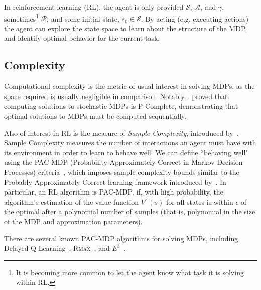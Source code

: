 \documentclass[11pt]{article}
\newcommand\davenote[1]{\textcolor{blue}{Dave: #1}}
\begin{document}

In reinforcement learning (RL), the agent is only provided $\mathcal{S}$, $\mathcal{A}$, and $\gamma$, sometimes\footnote{It is becoming more common to let the agent know what task it is solving within RL.} $\mathcal{R}$, and some initial state, $s_0 \in \mathcal{S}$. By acting (e.g. executing actions) the agent can explore the state space to learn about the structure of the MDP, and identify optimal behavior for the current task.


\subsection{Complexity}

Computational complexity is the metric of usual interest in solving MDPs, as the space required is usually negligible in comparison. Notably,~\cite{papadimitriou1987complexity} proved that computing solutions to stochastic MDPs is P-Complete, demonstrating that optimal solutions to MDPs must be computed sequentially.

Also of interest in RL is the measure of {\it Sample Complexity}, introduced by~\cite{kakade2003sample}. Sample Complexity measures the number of interactions an agent must have with its environment in order to learn to behave well. We can define ``behaving well" using the PAC-MDP (Probability Approximately Correct in Markov Decision Processes) criteria~, which imposes sample complexity bounds similar to the Probably Approximately Correct learning framework introduced by~\cite{valiant1984theory}. In particular, an RL algorithm is PAC-MDP, if, with high probability, the algorithm's estimation of the value function $V^\pi(s)$ for all states is within $\epsilon$ of the optimal after a polynomial number of samples (that is, polynomial in the size of the MDP and approximation parameters).

There are several known PAC-MDP algorithms for solving MDPs, including Delayed-Q Learning~, \textsc{Rmax}~, and $E^3$~.
\end{document}
